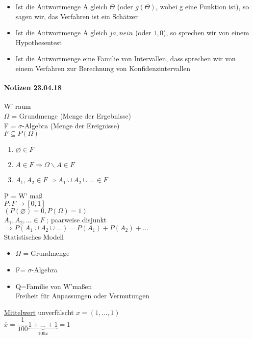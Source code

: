\documentclass[paper=a4, fontsize=11pt]{scrartcl}
\numberwithin{equation}{section}
\numberwithin{figure}{section}
\numberwithin{table}{section}
\begin{document}
\begin{itemize}
\item Ist die Antwortmenge A gleich $\Theta$ (oder $g(\Theta)$, wobei g eine Funktion ist), so sagen wir, das Verfahren ist ein Schätzer
\item Ist die Antwortmenge A gleich ${ja, nein}$ (oder ${1,0}$), so sprechen wir von einem Hypothesentest
\item Ist die Antwortmenge eine Familie von Intervallen, dass sprechen wir von einem Verfahren zur Berechnung von Konfidenzintervallen
\end{itemize}

\paragraph{Notizen 23.04.18}
W' raum \\
$\Omega$ = Grundmenge (Menge der Ergebnisse) \\
F = $\sigma$-Algebra (Menge der Ereignisse) \\

$F \subseteq P( \Omega)$ \\
\begin{enumerate}
\item $\varnothing \in F$
\item $A \in F \Rightarrow \Omega \backslash A \in F$
\item $A_{1},A_{2} \in F \Rightarrow A_{1} \cup A_{2} \cup ... \in F$
\end{enumerate}

P = W' maß \\
$P:F \rightarrow [0,1]$ \\
$(P( \varnothing)=0, P(\Omega)=1)$ \\
$A_{1},A_{2},... \in F$ ; paarweise disjunkt\\
$\Rightarrow P(A_{1} \cup A_{2} \cup ...) = P(A_{1})+P(A_{2})+...$ \\

Statistisches Modell
\begin{itemize}
\item $\Omega$ = Grundmenge
\item F= $\sigma$-Algebra
\item Q=Familie von W'maßen \\
Freiheit für Anpassungen oder Vermutungen 
\end{itemize}

\underline{Mittelwert}
unverfälscht $x=(1,...,1)$ \\
$\overline{x}=\dfrac{1}{100} \underbrace{1+...+1}_{100x}=1$ \\
\end{document}

